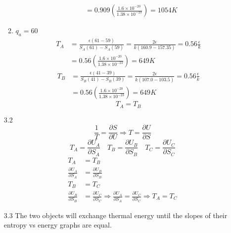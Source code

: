 \documentclass{article}
\begin{document}
\begin{enumerate}
\begin{enumerate}
\begin{align*}
                &= 0.909 \left( \frac{1.6 \times 10^{-20}}{1.38 \times 10^{-23}} \right) = 1054 K
            \end{align*}
            \item \(q_a = 60\)
            \begin{align*}
                T_A &= \frac{\epsilon (61 - 59)}{S_A(61) - S_A(59)} = \frac{2 \epsilon}{k(160.9 - 157.35)} = 0.56 \frac{\epsilon}{k} \\
                &= 0.56 \left( \frac{1.6 \times 10^{-20}}{1.38 \times 10^{-23}} \right) = 649 K
            \end{align*}
            \begin{align*}
                T_B &= \frac{\epsilon (41 - 39)}{S_B(41) - S_B(39)} = \frac{2 \epsilon}{k(107.0 - 103.5)} = 0.56 \frac{\epsilon}{k} \\
                &= 0.56 \left( \frac{1.6 \times 10^{-20}}{1.38 \times 10^{-23}} \right) = 649 K
            \end{align*}
            \[T_A = T_B\]
        \end{enumerate}
    \vspace{0.1in}
    \item [3.2]
        \[\frac{1}{T} = \frac{\partial S}{\partial U} \Rightarrow T = \frac{\partial U}{\partial S}\]
        \[T_A = \frac{\partial U_A}{\partial S_A} \quad T_B = \frac{\partial U_B}{\partial S_B} \quad T_C = \frac{\partial U_C}{\partial S_C}\]
        \begin{align*}
            T_A &= T_B \\
            \frac{\partial U_A}{\partial S_A} &= \frac{\partial U_B}{\partial S_B} \\
            T_B &= T_C \\
            \frac{\partial U_B}{\partial S_B} &= \frac{\partial U_C}{\partial S_C} \Rightarrow \frac{\partial U_A}{\partial S_A} = \frac{\partial U_C}{\partial S_C} \Rightarrow T_A = T_C
        \end{align*}
    \vspace{0.1in}
    \item [3.3]
        The two objects will exchange thermal energy until the slopes of their entropy vs energy graphs are equal.
    \vspace{0.1in}

\end{enumerate}
\end{document}
